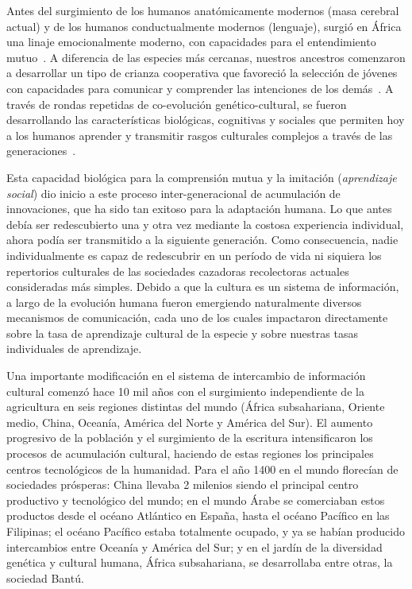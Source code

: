 \documentclass[a4paper,11pt]{book}
\theoremstyle{definition}
\begin{document}

Antes del surgimiento de los humanos anat\'omicamente modernos (masa cerebral actual) y de los humanos conductualmente modernos (lenguaje), surgi\'o en \'Africa una linaje emocionalmente moderno, con capacidades para el entendimiento mutuo~\cite{Hrdy2020}.
%
A diferencia de las especies m\'as cercanas, nuestros ancestros comenzaron a desarrollar un tipo de crianza cooperativa que favoreci\'o la selecci\'on de j\'ovenes con capacidades para comunicar y comprender las intenciones de los dem\'as~\cite{Hrdy2020}.
%
A trav\'es de rondas repetidas de co-evoluci\'on gen\'etico-cultural, se fueron desarrollando las caracter\'isticas biol\'ogicas, cognitivas y sociales que permiten hoy a los humanos aprender y transmitir rasgos culturales complejos a trav\'es de las generaciones~\cite{Jones2011}.

%

Esta capacidad biol\'ogica para la comprensi\'on mutua y la imitaci\'on (\emph{aprendizaje social}) dio inicio a este proceso inter-generacional de acumulaci\'on de innovaciones, que ha sido tan exitoso para la adaptaci\'on humana.
%
Lo que antes deb\'ia ser redescubierto una y otra vez mediante la costosa experiencia individual, ahora pod\'ia ser transmitido a la siguiente generaci\'on.
%
Como consecuencia, nadie individualmente es capaz de redescubrir en un per\'iodo de vida ni siquiera los repertorios culturales de las sociedades cazadoras recolectoras actuales consideradas m\'as simples.
%
Debido a que la cultura es un sistema de informaci\'on, a largo de la evoluci\'on humana fueron emergiendo naturalmente diversos mecanismos de comunicaci\'on, cada uno de los cuales impactaron directamente sobre la tasa de aprendizaje cultural de la especie y sobre nuestras tasas individuales de aprendizaje.


Una importante modificaci\'on en el sistema de intercambio de informaci\'on cultural comenz\'o hace 10 mil a\~nos con el surgimiento independiente de la agricultura en seis regiones distintas del mundo (\'Africa subsahariana, Oriente medio, China, Ocean\'ia, Am\'erica del Norte y Am\'erica del Sur).
%
El aumento progresivo de la poblaci\'on y el surgimiento de la escritura intensificaron los procesos de acumulaci\'on cultural, haciendo de estas regiones los principales centros tecnol\'ogicos de la humanidad.
%
Para el a\~no 1400 en el mundo florec\'ian de sociedades pr\'osperas: China llevaba 2 milenios siendo el principal centro productivo y tecnol\'ogico del mundo; en el mundo \'Arabe se comerciaban estos productos desde el oc\'eano Atl\'antico en Espa\~na, hasta el oc\'eano Pac\'ifico en las Filipinas; el oc\'eano Pac\'ifico estaba totalmente ocupado, y ya se hab\'ian producido intercambios entre Ocean\'ia y Am\'erica del Sur; y en el jard\'in de la diversidad gen\'etica y cultural humana, \'Africa subsahariana, se desarrollaba entre otras, la sociedad Bant\'u.
\end{document}
